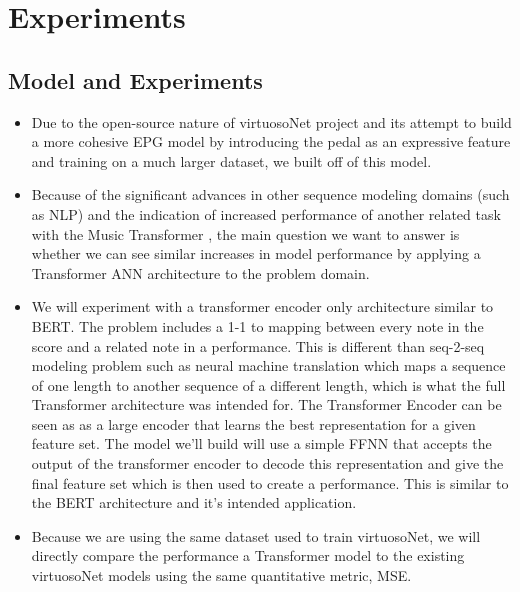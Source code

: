 \chapter{Experiments}\label{ch:ch4}

\section{Model and Experiments}
\begin{itemize}
    \item Due to the open-source nature of virtuosoNet project and its attempt to build a more cohesive EPG model by introducing the pedal as an expressive feature and training on a much larger dataset, we built off of this model. 
    \item Because of the significant advances in other sequence modeling domains (such as NLP) and the indication of increased performance of another related task with the Music Transformer \cite{huang2018music}, the main question we want to answer is whether we can see similar increases in model performance by applying a Transformer ANN architecture to the problem domain. 
    \item We will experiment with a transformer encoder only architecture similar to BERT. The problem includes a 1-1 to mapping between every note in the score and a related note in a performance. This is different than seq-2-seq modeling problem such as neural machine translation which maps a sequence of one length to another sequence of a different length, which is what the full Transformer architecture was intended for. The Transformer Encoder can be seen as as a large encoder that learns the best representation for a given feature set. The model we'll build will use a simple FFNN that accepts the output of the transformer encoder to decode this representation and give the final feature set which is then used to create a performance. This is similar to the BERT architecture and it's intended application. 
    \item Because we are using the same dataset used to train virtuosoNet, we will directly compare the performance a Transformer model to the existing virtuosoNet models using the same quantitative metric, MSE. 
    
\end{itemize}

